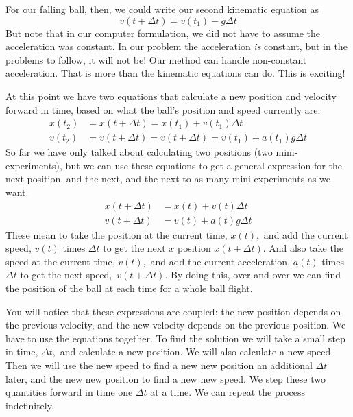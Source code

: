 \documentclass{book}
\begin{document}
For our falling ball, then, we could write our second kinematic equation as
\[
v(t+\Delta t)=v(t_{1})-g\Delta t
\]
But note that in our computer formulation, we did not have to assume the
acceleration was constant. In our problem the acceleration \emph{is} constant,
but in the problems to follow, it will not be! Our method can handle
non-constant acceleration. That is more than the kinematic equations can do.
This is exciting!

At this point we have two equations that calculate a new position and velocity
forward in time, based on what the ball's position and speed currently are: \begin{align*}
x(t_{2})  & =x(t+\Delta t)=x(t_{1})+v(t_{1})\Delta t\\
v(t_{2})  & =v(t+\Delta t)=v(t+\Delta t)=v(t_{1})+a(t_{1})g\Delta t
\end{align*}
So far we have only talked about calculating two positions (two
mini-experiments), but we can use these equations to get a general expression
for the next position, and the next, and the next to as many mini-experiments
as we want.
\begin{align*}
x(t+\Delta t)  & =x(t)+v(t)\Delta t\\
v(t+\Delta t)  & =v(t)+a(t)g\Delta t
\end{align*}
These mean to take the position at the current time, $x(t),$ and add the
current speed, $v\left(  t\right)  $ times $\Delta t$ to get the next $x$
position $x\left(  t+\Delta t\right)  .$ And also take the speed at the
current time, $v(t),$ and add the current acceleration, $a\left(  t\right)  $
times $\Delta t$ to get the next speed$,$ $v\left(  t+\Delta t\right)  .$ By
doing this, over and over we can find the position of the ball at each time
for a whole ball flight.

You will notice that these expressions are coupled: the new position depends
on the previous velocity, and the new velocity depends on the previous
position. We have to use the equations together. To find the solution we will
take a small step in time, $\Delta t,$ and calculate a new position. We will
also calculate a new speed. Then we will use the new speed to find a new new
position an additional $\Delta t$ later, and the new new position to find a
new new speed. We step these two quantities forward in time one $\Delta t$ at
a time. We can repeat the process indefinitely.
\end{document}

